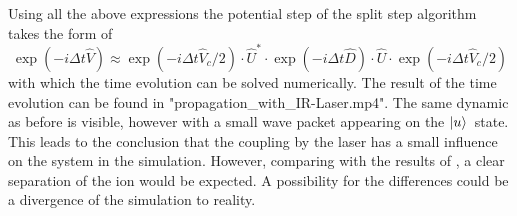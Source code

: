 \documentclass[12pt]{article}
\newcommand{\us}{$\ket{u}$}
\newcommand{\dt}{\Delta t}
\begin{document}
Using all the above expressions the potential step of the split step algorithm takes the form of
\begin{equation}
\exp(-i\dt\hat V)\approx \exp(-i\dt\hat V_c/2)\cdot\hat U^*\cdot \exp(-i \dt\hat D)\cdot\hat U\cdot \exp(-i \dt\hat V_c/2)
\end{equation}
with which the time evolution can be solved numerically. The result of the time evolution can be found in "propagation\_with\_IR-Laser.mp4".
The same dynamic as before is visible, however with a small wave packet appearing on the \us\ state. This leads to the conclusion that the coupling by the laser has a small influence on the system in the simulation. However, comparing with the results of \cite{PhysRevA.93.012507}, a clear separation of the ion would be expected. A possibility for the differences could be a divergence of the simulation to reality. 
\end{document}
